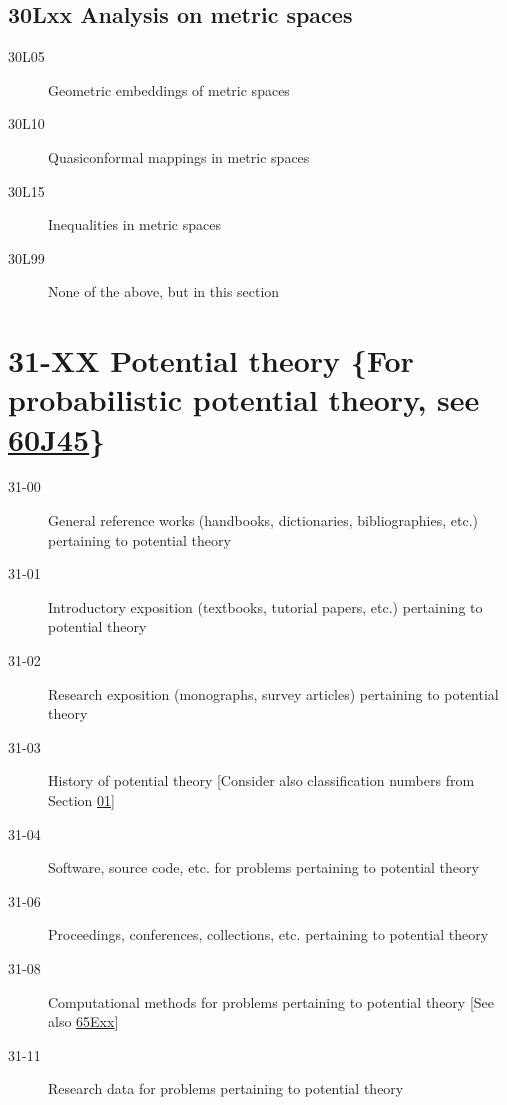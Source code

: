 \subsection*{30Lxx  Analysis on metric spaces }\label{30Lxx}
\begin{description}  
\item [30L05]\label{30L05} Geometric embeddings of metric spaces
\item [30L10]\label{30L10} Quasiconformal mappings in metric spaces
\item [30L15]\label{30L15} Inequalities in metric spaces
\item [30L99]\label{30L99} None of the above, but in this section
\end{description}
\section*{31-XX Potential theory \{For probabilistic potential theory, see \hyperref[60J45]{60J45}\} }\label{31-XX}
\begin{description}
\item [31-00]\label{31-00} General reference works (handbooks, dictionaries, bibliographies, etc.) pertaining to potential theory
\item [31-01]\label{31-01} Introductory exposition (textbooks, tutorial papers, etc.) pertaining to potential theory
\item [31-02]\label{31-02} Research exposition (monographs, survey articles) pertaining to potential theory
\item [31-03]\label{31-03} History of potential theory [Consider also classification numbers from Section \hyperref[01-XX]{01}]
\item [31-04]\label{31-04} Software, source code, etc. for problems pertaining to potential theory
\item [31-06]\label{31-06} Proceedings, conferences, collections, etc. pertaining to potential theory
\item [31-08]\label{31-08} Computational methods for problems pertaining to potential theory [See also \hyperref[65Exx]{65Exx}]
\item [31-11]\label{31-11} Research data for problems pertaining to potential theory
\end{description}
